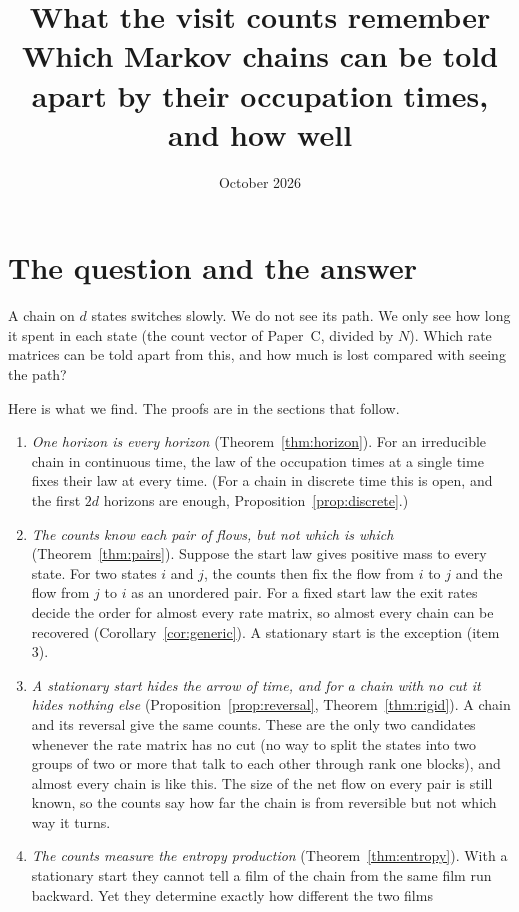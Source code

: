 \documentclass[11pt]{article}
\title{What the visit counts remember\\[4pt]
\large Which Markov chains can be told apart by their occupation times, and how well}
\author{}
\date{October 2026}
\theoremstyle{definition}
\theoremstyle{remark}
\begin{document}
\maketitle

\section{The question and the answer}

A chain on $d$ states switches slowly. We do not see its path. We only see how
long it spent in each state (the count vector of Paper~C, divided by $N$). Which
rate matrices can be told apart from this, and how much is lost compared with
seeing the path?

Here is what we find. The proofs are in the sections that follow.
\begin{enumerate}[1.,itemsep=2pt]
\item \emph{One horizon is every horizon} (Theorem~\ref{thm:horizon}). For an
 irreducible chain in continuous time, the law of the occupation times at a
 single time fixes their law at every time. (For a chain in discrete time this
 is open, and the first $2d$ horizons are enough,
 Proposition~\ref{prop:discrete}.)
\item \emph{The counts know each pair of flows, but not which is which}
 (Theorem~\ref{thm:pairs}). Suppose the start law gives positive mass to every
 state. For two states $i$ and $j$, the counts then fix the flow from $i$ to
 $j$ and the flow from $j$ to $i$ as an unordered pair. For a fixed start law
 the exit rates decide the order for almost every rate matrix, so almost every
 chain can be recovered (Corollary~\ref{cor:generic}). A stationary start is
 the exception (item 3).
\item \emph{A stationary start hides the arrow of time, and for a chain with no
 cut it hides nothing else}
 (Proposition~\ref{prop:reversal}, Theorem~\ref{thm:rigid}). A chain and its
 reversal give the same counts. These are the only two candidates whenever the
 rate matrix has no cut (no way to split the states into two groups of two or
 more that talk to each other through rank one blocks), and almost every chain
 is like this. The size of the net flow on every pair is still known, so the
 counts say how far the chain is from reversible but not which way it turns.
\item \emph{The counts measure the entropy production}
 (Theorem~\ref{thm:entropy}). With a stationary start they cannot tell a film
 of the chain from the same film run backward. Yet they determine exactly how different the two films

\end{enumerate}
\end{document}

